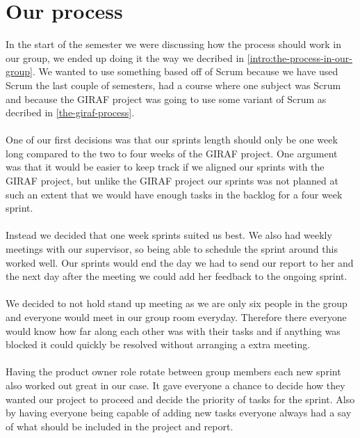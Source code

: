 \section{Our process}
In the start of the semester we were discussing how the process should work in our group, we ended up doing it the way we decribed in \autoref{intro:the-process-in-our-group}.
We wanted to use something based off of Scrum because we have used Scrum the last couple of semesters, had a course where one subject was Scrum and because the GIRAF project was going to use some variant of Scrum as decribed in \autoref{the-giraf-process}.
\\\\
One of our first decisions was that our sprints length should only be one week long compared to the two to four weeks of the GIRAF project.
One argument was that it would be easier to keep track if we aligned our sprints with the GIRAF project, but unlike the GIRAF project our sprints was not planned at such an extent that we would have enough tasks in the backlog for a four week sprint.
\\\\
Instead we decided that one week sprints suited us best.
We also had weekly meetings with our supervisor, so being able to schedule the sprint around this worked well.
Our sprints would end the day we had to send our report to her and the next day after the meeting we could add her feedback to the ongoing sprint.
\\\\
We decided to not hold stand up meeting as we are only six people in the group and everyone would meet in our group room everyday.
Therefore there everyone would know how far along each other was with their tasks and if anything was blocked it could quickly be resolved without arranging a extra meeting.
\\\\
Having the product owner role rotate between group members each new sprint also worked out great in our case.
It gave everyone a chance to decide how they wanted our project to proceed and decide the priority of tasks for the sprint.
Also by having everyone being capable of adding new tasks everyone always had a say of what should be included in the project and report.
